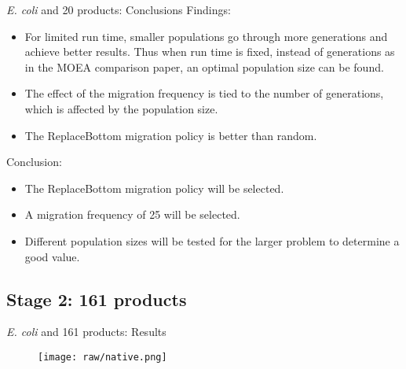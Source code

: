 \documentclass[8pt]{beamer}
\begin{document}
\begin{frame}{\protect\textit{E. coli} and 20 products: Conclusions}
Findings:
\begin{itemize}
    \item For limited run time, smaller populations go through more generations and achieve better results. Thus when run time is fixed, instead of generations as in the MOEA comparison paper, an optimal population size can be found.
    \item The effect of the migration frequency is tied to the number of generations, which is affected by the population size.
    \item The ReplaceBottom migration policy is better than random.
\end{itemize}
    Conclusion:
\begin{itemize}
    \item The ReplaceBottom migration policy will be selected.
    \item A migration frequency of 25 will be selected.
    \item Different population sizes will be tested for the larger problem to determine a good value.
\end{itemize}

\end{frame}

\subsection{Stage 2: 161 products}
\begin{frame}{\protect\textit{E. coli} and 161 products: Results}

\begin{figure}
    \centering
    \texttt{[image: raw/native.png]}
\end{figure}
\end{frame}
\end{document}
